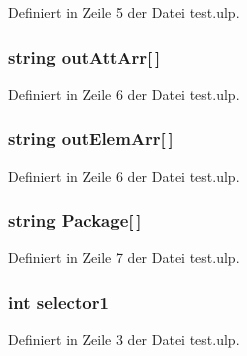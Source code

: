 Definiert in Zeile 5 der Datei test.\+ulp.

\hypertarget{test_8ulp_a801e8dfc827f7961b6012c0100f77ab4}{}
\subsubsection[{out\+Att\+Arr}]{\setlength{\rightskip}{0pt plus 5cm}string out\+Att\+Arr\mbox{[}$\,$\mbox{]}}\label{test_8ulp_a801e8dfc827f7961b6012c0100f77ab4}


Definiert in Zeile 6 der Datei test.\+ulp.

\hypertarget{test_8ulp_abd552ace971c34ee4d05fc524378dc32}{}
\subsubsection[{out\+Elem\+Arr}]{\setlength{\rightskip}{0pt plus 5cm}string out\+Elem\+Arr\mbox{[}$\,$\mbox{]}}\label{test_8ulp_abd552ace971c34ee4d05fc524378dc32}


Definiert in Zeile 6 der Datei test.\+ulp.

\hypertarget{test_8ulp_a36b57fe679881487796855a589fbfb85}{}
\subsubsection[{Package}]{\setlength{\rightskip}{0pt plus 5cm}string Package\mbox{[}$\,$\mbox{]}}\label{test_8ulp_a36b57fe679881487796855a589fbfb85}


Definiert in Zeile 7 der Datei test.\+ulp.

\hypertarget{test_8ulp_a2f0524c519c9a079ebbe76797552cfff}{}
\subsubsection[{selector1}]{\setlength{\rightskip}{0pt plus 5cm}int selector1}\label{test_8ulp_a2f0524c519c9a079ebbe76797552cfff}


Definiert in Zeile 3 der Datei test.\+ulp.

\hypertarget{test_8ulp_acb22ea06df7a98062b750ecca56f1628}{}
